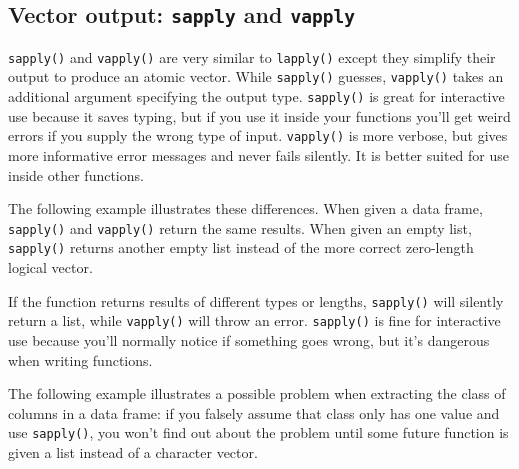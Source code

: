 \subsection{Vector output: \texttt{sapply} and \texttt{vapply}}

\texttt{sapply()} and \texttt{vapply()} are very similar to
\texttt{lapply()} except they simplify their output to produce an atomic
vector. While \texttt{sapply()} guesses, \texttt{vapply()} takes an
additional argument specifying the output type. \texttt{sapply()} is
great for interactive use because it saves typing, but if you use it
inside your functions you'll get weird errors if you supply the wrong
type of input. \texttt{vapply()} is more verbose, but gives more
informative error messages and never fails silently. It is better suited
for use inside other functions.  

The following example illustrates these differences. When given a data
frame, \texttt{sapply()} and \texttt{vapply()} return the same results.
When given an empty list, \texttt{sapply()} returns another empty list
instead of the more correct zero-length logical vector.

\begin{Shaded}
\begin{Highlighting}[]
\NormalTok{(}\NormalTok{))}
\NormalTok{(}
\NormalTok{(}\NormalTok{(}\NormalTok{))}
\end{Highlighting}
\end{Shaded}

If the function returns results of different types or lengths,
\texttt{sapply()} will silently return a list, while \texttt{vapply()}
will throw an error. \texttt{sapply()} is fine for interactive use
because you'll normally notice if something goes wrong, but it's
dangerous when writing functions.

The following example illustrates a possible problem when extracting the
class of columns in a data frame: if you falsely assume that class only
has one value and use \texttt{sapply()}, you won't find out about the
problem until some future function is given a list instead of a
character vector.

